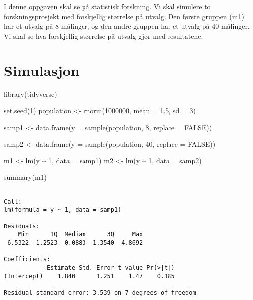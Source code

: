 \documentclass[
  letterpaper,
  DIV=11,
  numbers=noendperiod]{scrreprt}
\newenvironment{Shaded}{\begin{snugshade}}{\end{snugshade}}
\newcommand{\AttributeTok}[1]{\textcolor[rgb]{0.40,0.45,0.13}{#1}}
\newcommand{\ConstantTok}[1]{\textcolor[rgb]{0.56,0.35,0.01}{#1}}
\newcommand{\DecValTok}[1]{\textcolor[rgb]{0.68,0.00,0.00}{#1}}
\newcommand{\FloatTok}[1]{\textcolor[rgb]{0.68,0.00,0.00}{#1}}
\newcommand{\FunctionTok}[1]{\textcolor[rgb]{0.28,0.35,0.67}{#1}}
\newcommand{\NormalTok}[1]{\textcolor[rgb]{0.00,0.23,0.31}{#1}}
\newcommand{\OtherTok}[1]{\textcolor[rgb]{0.00,0.23,0.31}{#1}}
\newcommand{\SpecialCharTok}[1]{\textcolor[rgb]{0.37,0.37,0.37}{#1}}
\begin{document}
I denne oppgaven skal se på statistisk forskning. Vi skal simulere to
forskningsprosjekt med forskjellig størrelse på utvalg. Den første
gruppen (m1) har et utvalg på 8 målinger, og den andre gruppen har et
utvalg på 40 målinger. Vi skal se hva forskjellig størrelse på utvalg
gjør med resultatene.

\section{Simulasjon}\label{simulasjon}

\begin{Shaded}
\begin{Highlighting}[]
\FunctionTok{library}\NormalTok{(tidyverse)}

\FunctionTok{set.seed}\NormalTok{(}\DecValTok{1}\NormalTok{)}
\NormalTok{population }\OtherTok{\textless{}{-}} \FunctionTok{rnorm}\NormalTok{(}\DecValTok{1000000}\NormalTok{, }\AttributeTok{mean =} \FloatTok{1.5}\NormalTok{, }\AttributeTok{sd =} \DecValTok{3}\NormalTok{)}


\NormalTok{samp1 }\OtherTok{\textless{}{-}} \FunctionTok{data.frame}\NormalTok{(}\AttributeTok{y =} \FunctionTok{sample}\NormalTok{(population, }\DecValTok{8}\NormalTok{, }\AttributeTok{replace =} \ConstantTok{FALSE}\NormalTok{))}

\NormalTok{samp2 }\OtherTok{\textless{}{-}} \FunctionTok{data.frame}\NormalTok{(}\AttributeTok{y =} \FunctionTok{sample}\NormalTok{(population, }\DecValTok{40}\NormalTok{, }\AttributeTok{replace =} \ConstantTok{FALSE}\NormalTok{))}


\NormalTok{m1 }\OtherTok{\textless{}{-}} \FunctionTok{lm}\NormalTok{(y }\SpecialCharTok{\textasciitilde{}} \DecValTok{1}\NormalTok{, }\AttributeTok{data =}\NormalTok{ samp1)}
\NormalTok{m2 }\OtherTok{\textless{}{-}} \FunctionTok{lm}\NormalTok{(y }\SpecialCharTok{\textasciitilde{}} \DecValTok{1}\NormalTok{, }\AttributeTok{data =}\NormalTok{ samp2)}

\FunctionTok{summary}\NormalTok{(m1)}
\end{Highlighting}
\end{Shaded}

\begin{verbatim}

Call:
lm(formula = y ~ 1, data = samp1)

Residuals:
    Min      1Q  Median      3Q     Max 
-6.5322 -1.2523 -0.0883  1.3540  4.8692 

Coefficients:
            Estimate Std. Error t value Pr(>|t|)
(Intercept)    1.840      1.251    1.47    0.185

Residual standard error: 3.539 on 7 degrees of freedom
\end{verbatim}
\end{document}
